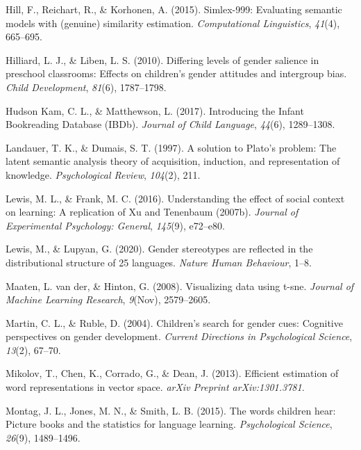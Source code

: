 \documentclass[
  english,
  ,man,floatsintext]{apa6}
\begin{document}
\leavevmode\hypertarget{ref-hill2015simlex}{}%
Hill, F., Reichart, R., \& Korhonen, A. (2015). Simlex-999: Evaluating semantic models with (genuine) similarity estimation. \emph{Computational Linguistics}, \emph{41}(4), 665--695.

\leavevmode\hypertarget{ref-hilliard2010differing}{}%
Hilliard, L. J., \& Liben, L. S. (2010). Differing levels of gender salience in preschool classrooms: Effects on children's gender attitudes and intergroup bias. \emph{Child Development}, \emph{81}(6), 1787--1798.

\leavevmode\hypertarget{ref-kam_2017}{}%
Hudson Kam, C. L., \& Matthewson, L. (2017). Introducing the Infant Bookreading Database (IBDb). \emph{Journal of Child Language}, \emph{44}(6), 1289--1308.

\leavevmode\hypertarget{ref-landauer1997solution}{}%
Landauer, T. K., \& Dumais, S. T. (1997). A solution to Plato's problem: The latent semantic analysis theory of acquisition, induction, and representation of knowledge. \emph{Psychological Review}, \emph{104}(2), 211.

\leavevmode\hypertarget{ref-lewis2016understanding}{}%
Lewis, M. L., \& Frank, M. C. (2016). Understanding the effect of social context on learning: A replication of Xu and Tenenbaum (2007b). \emph{Journal of Experimental Psychology: General}, \emph{145}(9), e72--e80.

\leavevmode\hypertarget{ref-lewis2020}{}%
Lewis, M., \& Lupyan, G. (2020). Gender stereotypes are reflected in the distributional structure of 25 languages. \emph{Nature Human Behaviour}, 1--8.

\leavevmode\hypertarget{ref-maaten2008visualizing}{}%
Maaten, L. van der, \& Hinton, G. (2008). Visualizing data using t-sne. \emph{Journal of Machine Learning Research}, \emph{9}(Nov), 2579--2605.

\leavevmode\hypertarget{ref-martin2004children}{}%
Martin, C. L., \& Ruble, D. (2004). Children's search for gender cues: Cognitive perspectives on gender development. \emph{Current Directions in Psychological Science}, \emph{13}(2), 67--70.

\leavevmode\hypertarget{ref-mikolov2013efficient}{}%
Mikolov, T., Chen, K., Corrado, G., \& Dean, J. (2013). Efficient estimation of word representations in vector space. \emph{arXiv Preprint arXiv:1301.3781}.

\leavevmode\hypertarget{ref-montag2015words}{}%
Montag, J. L., Jones, M. N., \& Smith, L. B. (2015). The words children hear: Picture books and the statistics for language learning. \emph{Psychological Science}, \emph{26}(9), 1489--1496.
\end{document}
